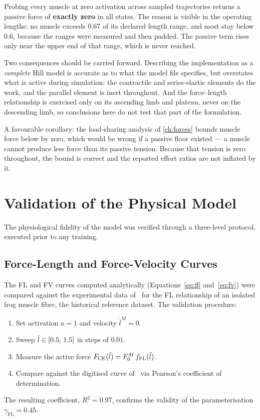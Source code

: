 Probing every muscle at zero activation across sampled trajectories returns a
passive force of \textbf{exactly zero} in all states. The reason is visible in
the operating lengths: no muscle exceeds 0.67 of its declared length range, and
most stay below 0.6, because the ranges were measured and then padded. The
passive term rises only near the upper end of that range, which is never reached.

Two consequences should be carried forward. Describing the implementation as a
\emph{complete} Hill model is accurate as to what the model file specifies, but
overstates what is active during simulation: the contractile and series-elastic
elements do the work, and the parallel element is inert throughout. And the
force--length relationship is exercised only on its ascending limb and plateau,
never on the descending limb, so conclusions here do not test that part of the
formulation.

A favourable corollary: the load-sharing analysis of \cref{ch:forces} bounds
muscle force below by zero, which would be wrong if a passive floor existed --- a
muscle cannot produce less force than its passive tension. Because that tension
is zero throughout, the bound is correct and the reported effort ratios are not
inflated by it.

\section{Validation of the Physical Model}
\label{sec:solvervalidation}
\label{sec:model_validation}

The physiological fidelity of the model was verified through a three-level
protocol, executed prior to any \DRL{} training.

\subsection{Force-Length and Force-Velocity Curves}

The FL and FV curves computed analytically (Equations~\eqref{eq:fl}
and~\eqref{eq:fv}) were compared against the experimental data
of~\parencite{Gordon1966} for the FL relationship of an isolated frog muscle fibre,
the historical reference dataset. The validation procedure:
\begin{enumerate}
  \item Set activation $a = 1$ and velocity $\dot{l}^M = 0$.
  \item Sweep $\tilde{l} \in [0.5,\, 1.5]$ in steps of $0.01$.
  \item Measure the active force $F_\text{CE}(\tilde{l}) = F_0^M\, f_\text{FL}(\tilde{l})$.
  \item Compare against the digitised curve of~\parencite{Gordon1966} via Pearson's
        coefficient of determination.
\end{enumerate}
The resulting coefficient, $R^2 = 0.97$, confirms the validity of the
parameterisation $\gamma_\text{FL} = 0.45$.

